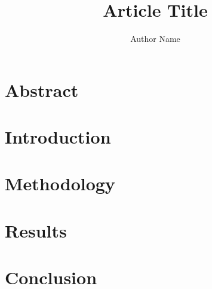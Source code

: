 \documentclass{article}
\begin{document}
\title{\textbf{\textcolor{primarycolor}{Article Title}}}
\author{\textcolor{primarycolor}{Author Name}}
\date{}

\maketitle

\section{Abstract}
\lipsum[1]

\section{Introduction}
\lipsum[2-3]

\section{Methodology}
\lipsum[4-5]

\section{Results}
\lipsum[6-7]

\section{Conclusion}
\lipsum[8]
\end{document}
